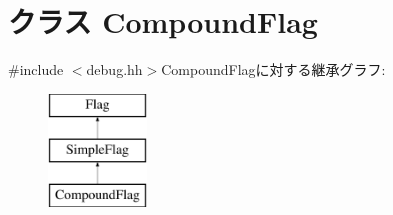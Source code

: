 \hypertarget{classDebug_1_1CompoundFlag}{
\section{クラス CompoundFlag}
\label{classDebug_1_1CompoundFlag}
}


{\ttfamily \#include $<$debug.hh$>$}CompoundFlagに対する継承グラフ:\begin{figure}[H]
\begin{center}
\leavevmode
\includegraphics[height=3cm]{classDebug_1_1CompoundFlag}
\end{center}
\end{figure}
